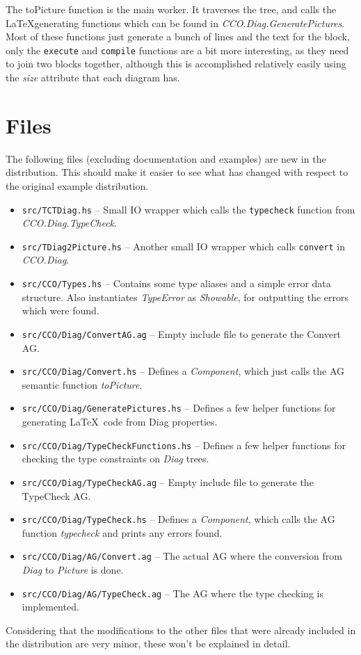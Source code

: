 \documentclass[a4paper]{article}
\begin{document}
The toPicture function is the main worker. It traverses the tree, and calls the \LaTeX\-generating functions which can be found in \emph{CCO.Diag.GeneratePictures}. Most of these functions just generate a bunch of lines and the text for the block, only the \texttt{execute} and \texttt{compile} functions are a bit more interesting, as they need to join two blocks together, although this is accomplished relatively easily using the \emph{size} attribute that each diagram has. 



\section{Files}

The following files (excluding documentation and examples) are new in the distribution. This should make it easier to see what has changed with respect to the original example distribution. 

\begin{itemize}
    \item \texttt{src/TCTDiag.hs} -- Small IO wrapper which calls the \texttt{typecheck} function from \emph{CCO.Diag.TypeCheck}. 
    \item \texttt{src/TDiag2Picture.hs} -- Another small IO wrapper which calls \texttt{convert} in \emph{CCO.Diag}.
    \item \texttt{src/CCO/Types.hs} -- Contains some type aliases and a simple error data structure. Also instantiates \emph{TypeError} as \emph{Showable}, for outputting the errors which were found. 
    \item \texttt{src/CCO/Diag/ConvertAG.ag} -- Empty include file to generate the Convert AG.
    \item \texttt{src/CCO/Diag/Convert.hs} -- Defines a \emph{Component}, which just calls the AG semantic function \emph{toPicture}. 
    \item \texttt{src/CCO/Diag/GeneratePictures.hs} -- Defines a few helper functions for generating \LaTeX\ code from Diag properties.
    \item \texttt{src/CCO/Diag/TypeCheckFunctions.hs} -- Defines a few helper functions for checking the type constraints on \emph{Diag} trees. 
    \item \texttt{src/CCO/Diag/TypeCheckAG.ag} -- Empty include file to generate the TypeCheck AG.
    \item \texttt{src/CCO/Diag/TypeCheck.hs} -- Defines a \emph{Component}, which calls the AG function \emph{typecheck} and prints any errors found.
    \item \texttt{src/CCO/Diag/AG/Convert.ag} -- The actual AG where the conversion from \emph{Diag} to \emph{Picture} is done. 
    \item \texttt{src/CCO/Diag/AG/TypeCheck.ag} -- The AG where the type checking is implemented.
\end{itemize}

Considering that the modifications to the other files that were already included in the distribution are very minor, these won't be explained in detail. 
\end{document}
